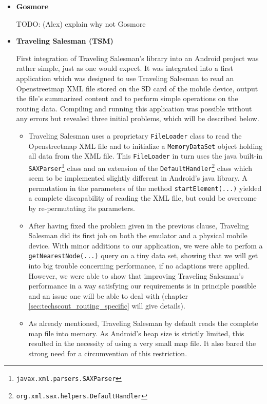 \begin{itemize}

	\item \textbf{Gosmore}	
	
		TODO: (Alex) explain why not Gosmore
	
	\item \textbf{Traveling Salesman (TSM)}
	
		First integration of Traveling Salesman's library into an Android project was rather simple, just as one would expect. It was integrated into a first application which was designed to use Traveling Salesman to read an Openstreetmap XML file stored on the SD card of the mobile device, output the file's summarized content and to perform simple operations on the routing data. Compiling and running this application was possible without any errors but revealed three initial problems, which will be described below.
		
		\begin{itemize}
		
			\item Traveling Salesman uses a proprietary \texttt{FileLoader} class to read the Openstreetmap XML file and to initialize a  \texttt{MemoryDataSet} object holding all data from the XML file. This \texttt{FileLoader} in turn uses the java built-in  \texttt{SAXParser}\footnote{ \texttt{javax.xml.parsers.SAXParser}} class and an extension of the  \texttt{DefaultHandler}\footnote{\texttt{org.xml.sax.helpers.DefaultHandler}} class which seem to be implemented slightly different in Android's java library. A permutation in the parameters of the method  \texttt{startElement(...)} yielded a complete discapability of reading the XML file, but could be overcome by re-permutating its parameters.
			
			\item After having fixed the problem given in the previous clause, Traveling Salesman did its first job on both the emulator and a physical mobile device. With minor additions to our application, we were able to perfom a \texttt{getNearestNode(...)} query on a tiny data set, showing that we will get into big trouble concerning performance, if no adaptions were applied. However, we were able to show that improving Traveling Salesman's performance in a way satisfying our requirements is in principle possible and an issue one will be able to deal with (chapter \ref{sec:techscout_routing_specific} will give details).	

			\item As already mentioned, Traveling Salesman by default reads the complete map file into memory. As Android's heap size is strictly limited, this resulted in the necessity of using a very small map file. It also bared the strong need for a circumvention of this restriction.
		

\end{itemize}
\end{itemize}
